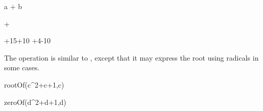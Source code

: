{{{{{{{{{{{\begin{xtc}
\begin{spadsrc}
a + b 
\end{spadsrc}
\begin{TeXOutput}
\begin{fricasmath}{4}
+%
\end{fricasmath}
\end{TeXOutput}
\end{xtc}
\begin{xtc}
\begin{xtccomment}
\end{xtccomment}
\begin{spadsrc}
\end{spadsrc}
\begin{TeXOutput}
\begin{fricasmath}{5}
\TIMES {}+15\TIMES {}+10\TIMES %
+4\TIMES {}-{10}%
\end{fricasmath}
\end{TeXOutput}
\end{xtc}
\begin{xtc}
\begin{xtccomment}
The operation  is similar to ,
except that it may express the root using radicals in some cases.
\end{xtccomment}
\begin{spadsrc}
rootOf(c^2+c+1,c)
\end{spadsrc}
\begin{TeXOutput}
\begin{fricasmath}{6}
%
\end{fricasmath}
\end{TeXOutput}
\end{xtc}
\begin{xtc}
\begin{xtccomment}
\end{xtccomment}
\begin{spadsrc}
zeroOf(d^2+d+1,d)
\end{spadsrc}
\begin{TeXOutput}
\begin{fricasmath}{7}
%
\end{fricasmath}
\end{TeXOutput}
\end{xtc}
}}}}}}}}}}}
